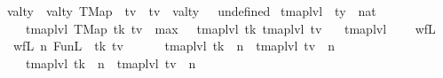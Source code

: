 \begin{isabellebody}
\isamarkupfalse%
\ val{\isacharunderscore}{\kern0pt}ty\ \ {\isachardoublequoteopen}val{\isacharunderscore}{\kern0pt}ty\ {\isacharparenleft}{\kern0pt}TMap\ {\isacharunderscore}{\kern0pt}\ tv{\isacharparenright}{\kern0pt}\ {\isacharequal}{\kern0pt}\ tv{\isachardoublequoteclose}\ {\isacharbar}{\kern0pt}\ {\isachardoublequoteopen}val{\isacharunderscore}{\kern0pt}ty\ {\isacharunderscore}{\kern0pt}\ {\isacharequal}{\kern0pt}\ undefined{\isachardoublequoteclose}\isanewline
\isanewline
{}\isamarkupfalse%
\ tmap{\isacharunderscore}{\kern0pt}lvl\ {\isacharcolon}{\kern0pt}{\isacharcolon}{\kern0pt}\ {\isachardoublequoteopen}ty\ {\isasymRightarrow}\ nat{\isachardoublequoteclose}\ \isanewline
\ \ \ \ {\isachardoublequoteopen}tmap{\isacharunderscore}{\kern0pt}lvl\ {\isacharparenleft}{\kern0pt}TMap\ tk\ tv{\isacharparenright}{\kern0pt}\ {\isacharequal}{\kern0pt}\ max\ {\isacharparenleft}{\kern0pt}{}\ {\isacharplus}{\kern0pt}\ tmap{\isacharunderscore}{\kern0pt}lvl\ tk{\isacharparenright}{\kern0pt}\ {\isacharparenleft}{\kern0pt}tmap{\isacharunderscore}{\kern0pt}lvl\ tv{\isacharparenright}{\kern0pt}{\isachardoublequoteclose}\isanewline
\ \ {\isacharbar}{\kern0pt}\ {\isachardoublequoteopen}tmap{\isacharunderscore}{\kern0pt}lvl\ {\isacharunderscore}{\kern0pt}\ {\isacharequal}{\kern0pt}\ {}{\isachardoublequoteclose}\isanewline
\isanewline
{}\isamarkupfalse%
\ wf{\isacharunderscore}{\kern0pt}L\ \isanewline
\ \ {\isachardoublequoteopen}wf{\isacharunderscore}{\kern0pt}L\ n\ {\isacharparenleft}{\kern0pt}FunL\ {\isacharunderscore}{\kern0pt}\ tk\ tv{\isacharparenright}{\kern0pt}\ {\isacharequal}{\kern0pt}\ {\isacharparenleft}{\kern0pt}\isanewline
\ \ \ \ {\isacharparenleft}{\kern0pt}tmap{\isacharunderscore}{\kern0pt}lvl\ tk\ {\isasymle}\ n{\isacharminus}{\kern0pt}{}{\isacharparenright}{\kern0pt}\ {\isasymand}\ {\isacharparenleft}{\kern0pt}tmap{\isacharunderscore}{\kern0pt}lvl\ tv\ {\isasymle}\ n{\isacharparenright}{\kern0pt}\ {\isasymand}\isanewline
\ \ \ \ {\isacharparenleft}{\kern0pt}{\isacharparenleft}{\kern0pt}tmap{\isacharunderscore}{\kern0pt}lvl\ tk\ {\isacharequal}{\kern0pt}\ n{\isacharminus}{\kern0pt}{}{\isacharparenright}{\kern0pt}\ {\isasymor}\ {\isacharparenleft}{\kern0pt}tmap{\isacharunderscore}{\kern0pt}lvl\ tv\ {\isacharequal}{\kern0pt}\ n{\isacharparenright}{\kern0pt}{\isacharparenright}{\kern0pt}{\isacharparenright}{\kern0pt}{\isachardoublequoteclose}\ \ \isanewline
\isanewline
{}\isamarkupfalse%

\end{isabellebody}
